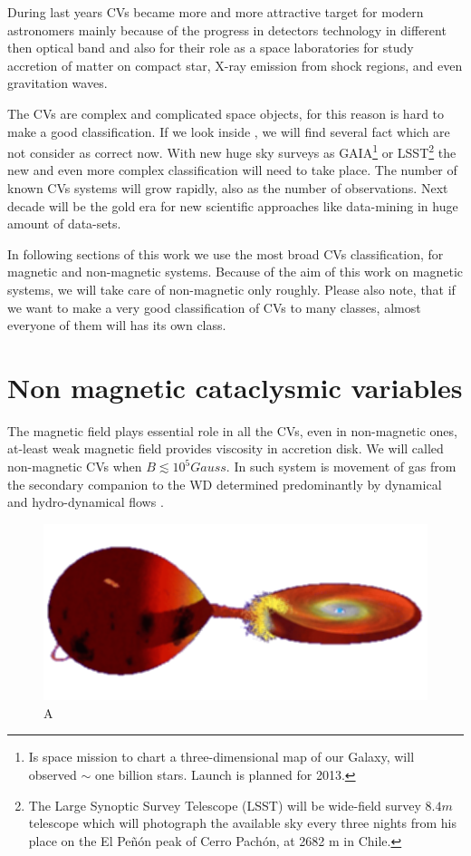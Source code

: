 \documentclass[oneside,a4paper,11pt]{report}
\begin{document}
During last years CVs became more and more attractive target for modern astronomers mainly because of  
the progress in detectors technology in different then optical band and also for their role as a 
space laboratories for study accretion of matter on compact star, X-ray emission from shock regions, 
and even gravitation waves. 

The CVs are complex and complicated space objects, for this reason is hard to make a good 
classification. If we look inside \citet{warner:1}, we will find several fact which are not 
consider as correct now. With new huge sky surveys as GAIA\footnote{Is space mission
to chart a three-dimensional map of our Galaxy, will observed $\sim$ one billion stars. Launch is planned for 2013.} 
or LSST\footnote{The Large Synoptic Survey Telescope (LSST) will be wide-field survey $8.4m$ 
telescope which will photograph the available sky every three nights from his place on the 
El Peñón peak of Cerro Pachón, at 2682 m in Chile. } the new and even more 
complex classification will need to take place.    
The number of known CVs systems will grow rapidly, also as the number of observations. Next decade 
will be the gold era for new scientific approaches like data-mining in huge amount of data-sets.

In following sections of this work we use the most broad CVs classification, for magnetic and non-magnetic
systems. Because of the aim of this work on magnetic systems, we will take care of non-magnetic only  
roughly. Please also note, that if we want to make a very good classification of CVs to many classes, 
almost everyone of them will has its own class.  


  
\section{Non magnetic cataclysmic variables} 
The magnetic field plays essential role in all the CVs, even in non-magnetic ones, at-least weak 
magnetic field provides viscosity in accretion disk. We will called non-magnetic CVs when 
$B\lesssim10^5 Gauss$. 
In such system is movement of gas from the secondary companion to the WD determined predominantly 
by dynamical and hydro-dynamical flows \citet{warner:1}.

\begin{figure}[hbt]
\centering
\includegraphics[totalheight=3cm]{plot/cv}
\caption{A}
\label{hrd1} 
\end{figure}
\end{document}
